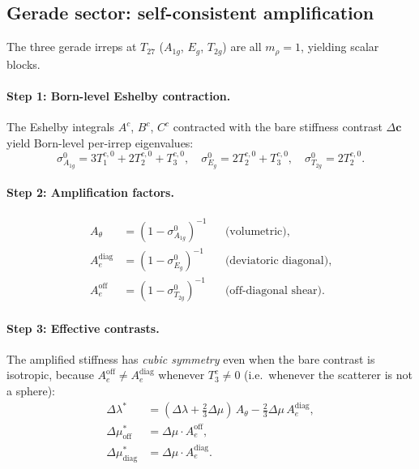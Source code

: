 \documentclass[11pt,a4paper]{article}
\newcommand{\D}{\Delta}
\theoremstyle{plain}
\theoremstyle{definition}
\theoremstyle{remark}
\begin{document}
\subsection{Gerade sector: self-consistent amplification}

The three gerade irreps at $T_{27}$ ($A_{1g}$, $E_g$, $T_{2g}$)
are all $m_\rho = 1$, yielding scalar blocks.

\paragraph{Step 1: Born-level Eshelby contraction.}
The Eshelby integrals $A^c$, $B^c$, $C^c$ contracted with the bare
stiffness contrast $\D\mathbf{c}$ yield Born-level per-irrep
eigenvalues:
\begin{equation}
  \sigma_{A_{1g}}^0 = 3T_1^{c,0} + 2T_2^{c,0} + T_3^{c,0},\quad
  \sigma_{E_g}^0 = 2T_2^{c,0} + T_3^{c,0},\quad
  \sigma_{T_{2g}}^0 = 2T_2^{c,0}.
  \label{eq:born-sigma}
\end{equation}

\paragraph{Step 2: Amplification factors.}
\begin{align}
  A_\theta &= (1 - \sigma_{A_{1g}}^0)^{-1}
    &&\text{(volumetric)},\label{eq:amp-A1g}\\
  A_e^{\mathrm{diag}} &= (1 - \sigma_{E_g}^0)^{-1}
    &&\text{(deviatoric diagonal)},\label{eq:amp-Eg}\\
  A_e^{\mathrm{off}} &= (1 - \sigma_{T_{2g}}^0)^{-1}
    &&\text{(off-diagonal shear)}.\label{eq:amp-T2g}
\end{align}

\paragraph{Step 3: Effective contrasts.}
The amplified stiffness has \emph{cubic symmetry} even when the bare
contrast is isotropic, because
$A_e^{\mathrm{off}} \neq A_e^{\mathrm{diag}}$ whenever $T_3^c \neq 0$
(i.e.\ whenever the scatterer is not a sphere):
\begin{align}
  \D\lambda^* &= (\D\lambda + \tfrac{2}{3}\D\mu)\,A_\theta
    - \tfrac{2}{3}\D\mu\,A_e^{\mathrm{diag}},
    \label{eq:Dlambda-star}\\
  \D\mu^*_{\mathrm{off}} &= \D\mu \cdot A_e^{\mathrm{off}},
    \label{eq:Dmu-off}\\
  \D\mu^*_{\mathrm{diag}} &= \D\mu \cdot A_e^{\mathrm{diag}}.
    \label{eq:Dmu-diag}
\end{align}
\end{document}

